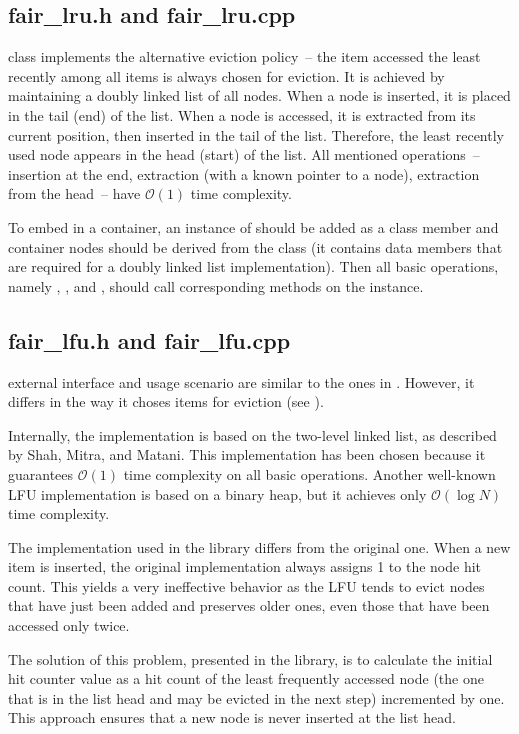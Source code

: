 \subsection{fair\_lru.h and fair\_lru.cpp}
 class implements the alternative eviction policy~-- the item accessed the least recently among all items is always chosen for eviction. It is achieved by maintaining a doubly linked list of all nodes. When a node is inserted, it is placed in the tail (end) of the list. When a node is accessed, it is extracted from its current position, then inserted in the tail of the list. Therefore, the least recently used node appears in the head (start) of the list. All mentioned operations~-- insertion at the end, extraction (with a known pointer to a node), extraction from the head~-- have $\mathcal{O}(1)$ time complexity.

To embed  in a container, an instance of  should be added as a class member and container nodes should be derived from the  class (it contains data members that are required for a doubly linked list implementation). Then all basic operations, namely \findop, \insertop, and \removeop, should call corresponding methods on the  instance.

\subsection{fair\_lfu.h and fair\_lfu.cpp}
 external interface and usage scenario are similar to the ones in . However, it differs in the way it choses items for eviction (see ).

Internally, the implementation is based on the two-level linked list, as described by Shah, Mitra, and Matani\cite{lfu}. This implementation has been chosen because it guarantees $\mathcal{O}(1)$ time complexity on all basic operations. Another well-known LFU implementation is based on a binary heap, but it achieves only $\mathcal{O}(\log N)$ time complexity.

The implementation used in the library differs from the original one. When a new item is inserted, the original implementation always assigns 1 to the node hit count. This yields a very ineffective behavior as the LFU tends to evict nodes that have just been added and preserves older ones, even those that have been accessed only twice.

The solution of this problem, presented in the library, is to calculate the initial hit counter value as a hit count of the least frequently accessed node (the one that is in the list head and may be evicted in the next step) incremented by one. This approach ensures that a new node is never inserted at the list head.

